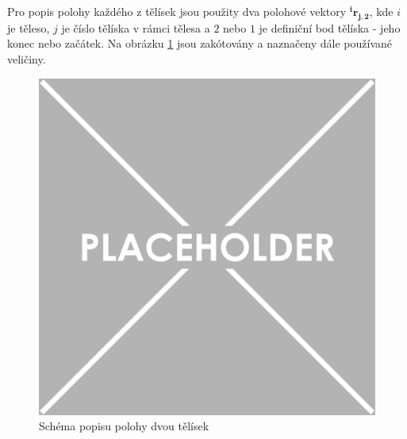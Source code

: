 Pro popis polohy každého z tělísek jsou použity dva polohové vektory $ \mathbf{^{i}r_{j,2}} $, kde $ i $ je těleso, $ j $ je číslo tělíska v rámci tělesa a $ 2 $ nebo $ 1 $ je definiční bod tělíska - jeho konec nebo začátek. Na obrázku \ref{fig:RFE_metoda} jsou zakótovány a naznačeny dále používané veličiny.
\begin{figure}[H]
	\centering
	\includegraphics[width=0.85\linewidth]{img/placeholder.pdf}
	\caption{Schéma popisu polohy dvou tělísek}
	\label{fig:RFE_metoda}
\end{figure}

